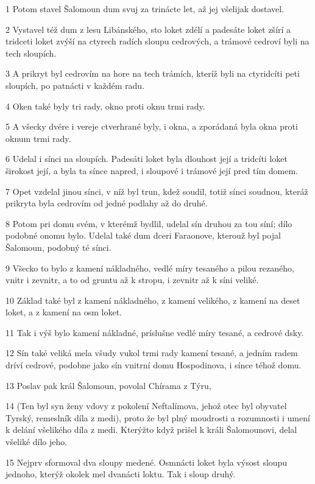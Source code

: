 \par 1 Potom stavel Šalomoun dum svuj za trinácte let, až jej všelijak dostavel.
\par 2 Vystavel též dum z lesu Libánského, sto loket zdélí a padesáte loket zšírí a tridceti loket zvýší na ctyrech radích sloupu cedrových, a trámové cedroví byli na tech sloupích.
\par 3 A prikryt byl cedrovím na hore na tech trámích, kteríž byli na ctyridcíti peti sloupích, po patnácti v každém radu.
\par 4 Oken také byly tri rady, okno proti oknu trmi rady.
\par 5 A všecky dvére i vereje ctverhrané byly, i okna, a zporádaná byla okna proti oknum trmi rady.
\par 6 Udelal i sínci na sloupích. Padesáti loket byla dlouhost její a tridcíti loket širokost její, a byla ta sínce napred, i sloupové i trámové její pred tím domem.
\par 7 Opet vzdelal jinou sínci, v níž byl trun, kdež soudil, totiž sínci soudnou, kteráž prikryta byla cedrovím od jedné podlahy až do druhé.
\par 8 Potom pri domu svém, v kterémž bydlil, udelal sín druhou za tou síní; dílo podobné onomu bylo. Udelal také dum dceri Faraonove, kterouž byl pojal Šalomoun, podobný té sínci.
\par 9 Všecko to bylo z kamení nákladného, vedlé míry tesaného a pilou rezaného, vnitr i zevnitr, a to od gruntu až k stropu, i zevnitr až k síni veliké.
\par 10 Základ také byl z kamení nákladného, z kamení velikého, z kamení na deset loket, a z kamení na osm loket.
\par 11 Tak i výš bylo kamení nákladné, príslušne vedlé míry tesané, a cedrové dsky.
\par 12 Sín také veliká mela všudy vukol trmi rady kamení tesané, a jedním radem dríví cedrové, podobne jako sín vnitrní domu Hospodinova, i sínce téhož domu.
\par 13 Poslav pak král Šalomoun, povolal Chírama z Týru,
\par 14 (Ten byl syn ženy vdovy z pokolení Neftalímova, jehož otec byl obyvatel Tyrský, remeslník díla z medi), proto že byl plný moudrosti a rozumnosti i umení k delání všelikého díla z medi. Kterýžto když prišel k králi Šalomounovi, delal všeliké dílo jeho.
\par 15 Nejprv sformoval dva sloupy medené. Osmnácti loket byla výsost sloupu jednoho, kterýž okolek mel dvanácti loktu. Tak i sloup druhý.
